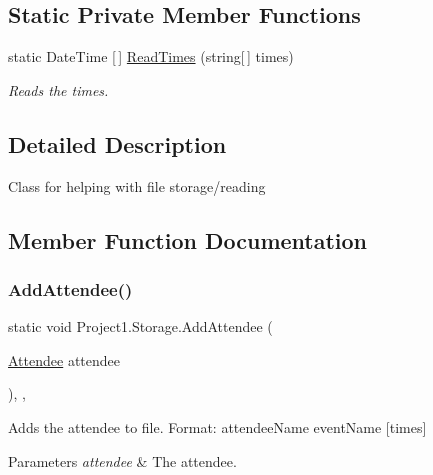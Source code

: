 \subsection*{Static Private Member Functions}
\begin{DoxyCompactItemize}
\item 
static Date\+Time \mbox{[}$\,$\mbox{]} \hyperlink{classProject1_1_1Storage_a376dc3238d3e8ab23781d5401e428865}{Read\+Times} (string\mbox{[}$\,$\mbox{]} times)
\begin{DoxyCompactList}\small\item\em Reads the times. \end{DoxyCompactList}\end{DoxyCompactItemize}


\subsection{Detailed Description}
Class for helping with file storage/reading 



\subsection{Member Function Documentation}
\mbox{\label{classProject1_1_1Storage_a565feda8803f2fccc4e5a3335903e4fc}} 
\subsubsection{\texorpdfstring{Add\+Attendee()}{AddAttendee()}}
{\footnotesize\ttfamily static void Project1.\+Storage.\+Add\+Attendee (\begin{DoxyParamCaption}\item[{\hyperlink{classProject1_1_1Attendee}{Attendee}}]{attendee }\end{DoxyParamCaption})\hspace{0.3cm}{\ttfamily [inline]}, {\ttfamily [static]}, {\ttfamily [package]}}



Adds the attendee to file. Format\+: attendee\+Name event\+Name \mbox{[}times\mbox{]} 


\begin{DoxyParams}{Parameters}
{\em attendee} & The attendee.\\
\hline
\end{DoxyParams}
\mbox{\label{classProject1_1_1Storage_ae01896659ba07c9e623c37d3ed1caaef}} 
